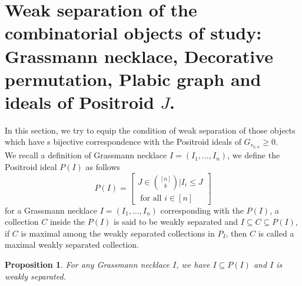 \documentclass[12pt]{report}
\theoremstyle{theorem}
\newtheorem{proposition}[theorem]{Proposition}
\begin{document}
\section*{Weak separation of the combinatorial objects of study: Grassmann necklace, Decorative permutation, Plabic graph and ideals of Positroid $J$.}
In this section, we try to equip the condition of weak separation of those objects which have s bijective correspondence with the Positroid ideals of $G_{r_{k,n}}\geq 0$. \\
We recall a definition of Grassmann necklace $I = (I_1,\ldots,I_n)$, we define the Positroid ideal $P(I)$ as follows
\begin{equation*}
P(I) = \left[
\begin{split}
J \in \binom{[n]}{k}|I_i\leq J\\
\mbox{  for all  } i \in [n]
\end{split}
\right]
\end{equation*}
for a Grassmann necklace $I = (I_1,\ldots,I_n)$ corresponding with the $P(I)$, a collection $C$ inside the $P(I)$ is said to be weakly separated and $I\subseteq C\subseteq P(I)$, if $C$ is maximal among the weakly separated collections in $P_{I}$, then $C$ is called a maximal weakly separated collection.

\begin{proposition}
For any Grassmann necklace $I$, we have $I\subseteq P(I)$ and $I$ is weakly separated.
\end{proposition}
\end{document}
